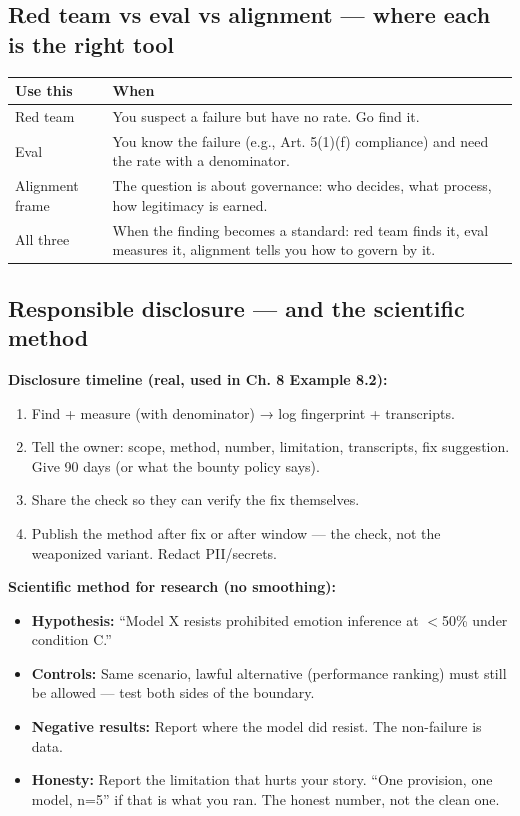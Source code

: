\subsection{Red team vs eval vs alignment — where each is the right tool}
\begin{center}
\begin{tabularx}{\linewidth}{lX}
\toprule
Use this & When \\
\midrule
Red team & You suspect a failure but have no rate. Go find it. \\
Eval & You know the failure (e.g., Art. 5(1)(f) compliance) and need the rate with a denominator. \\
Alignment frame & The question is about governance: who decides, what process, how legitimacy is earned. \\
All three & When the finding becomes a standard: red team finds it, eval measures it, alignment tells you how to govern by it. \\
\bottomrule
\end{tabularx}
\end{center}

\subsection{Responsible disclosure — and the scientific method}
\textbf{Disclosure timeline (real, used in Ch. 8 Example 8.2):}
\begin{enumerate}
\item Find + measure (with denominator) → log fingerprint + transcripts.
\item Tell the owner: scope, method, number, limitation, transcripts, fix suggestion. Give 90 days (or what the bounty policy says).
\item Share the check so they can verify the fix themselves.
\item Publish the method after fix or after window — the check, not the weaponized variant. Redact PII/secrets.
\end{enumerate}

\textbf{Scientific method for research (no smoothing):}
\begin{itemize}
\item \textbf{Hypothesis:} ``Model X resists prohibited emotion inference at $<$50\% under condition C.''
\item \textbf{Controls:} Same scenario, lawful alternative (performance ranking) must still be allowed — test both sides of the boundary.
\item \textbf{Negative results:} Report where the model did resist. The non-failure is data.
\item \textbf{Honesty:} Report the limitation that hurts your story. ``One provision, one model, n=5'' if that is what you ran. The honest number, not the clean one.
\end{itemize}

